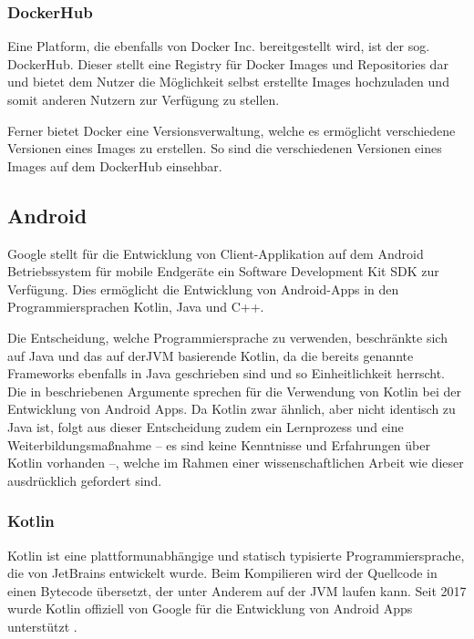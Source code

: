 			\subsubsection{DockerHub} %
				
				Eine Platform, die ebenfalls von Docker Inc. bereitgestellt wird, ist der sog. DockerHub. Dieser stellt eine Registry für Docker Images und Repositories dar und bietet dem Nutzer die Möglichkeit selbst erstellte Images hochzuladen und somit anderen Nutzern zur Verfügung zu stellen. 
				
				Ferner bietet Docker eine Versionsverwaltung, welche es ermöglicht verschiedene Versionen eines Images zu erstellen. So sind die verschiedenen Versionen eines Images auf dem DockerHub einsehbar.
		
		\subsection{Android} %
	
			Google stellt für die Entwicklung von Client-Applikation auf dem Android Betriebssystem für mobile Endgeräte ein Software Development Kit \acs{SDK} zur Verfügung. Dies ermöglicht die Entwicklung von Android-Apps in den Programmiersprachen Kotlin, Java und C++. 
			
			Die Entscheidung, welche Programmiersprache zu verwenden, beschränkte sich auf Java und das auf der\acs{JVM} basierende Kotlin, da die bereits genannte Frameworks ebenfalls in Java geschrieben sind und so Einheitlichkeit herrscht. Die in \cite{AnnieDossey.2019} beschriebenen Argumente sprechen für die Verwendung von Kotlin bei der Entwicklung von Android Apps. Da Kotlin zwar ähnlich, aber nicht identisch zu Java ist, folgt aus dieser Entscheidung zudem ein Lernprozess und eine Weiterbildungsmaßnahme -- es sind keine Kenntnisse und Erfahrungen über Kotlin vorhanden --, welche im Rahmen einer wissenschaftlichen Arbeit wie dieser ausdrücklich gefordert sind.
		
			\subsubsection{Kotlin} %
			
				Kotlin ist eine plattformunabhängige und statisch typisierte Programmiersprache, die von JetBrains entwickelt wurde. Beim Kompilieren wird der Quellcode in einen Bytecode übersetzt, der unter Anderem auf der JVM laufen kann. Seit 2017 wurde Kotlin offiziell von Google für die Entwicklung von Android Apps unterstützt \cite{JetBrains.2017}. 
				
